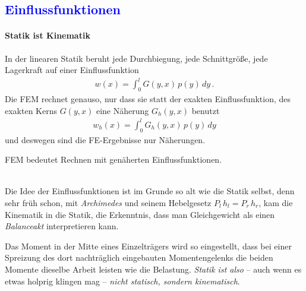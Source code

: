 {\textcolor{blue}{\chapter{Einflussfunktionen}}}

{\textcolor{sectionTitleBlue}{\subsubsection*{Statik ist Kinematik}}}

In der linearen Statik beruht jede Durchbiegung, jede Schnittgr\"{o}{\ss}e, jede Lagerkraft auf einer Einflussfunktion
\begin{align}
w(x) = \int_{0}^{l} G(y,x)\,p(y)\,dy\,.
\end{align}
Die FEM rechnet genauso, nur dass sie statt der exakten Einflussfunktion, des exakten Kerns $G(y,x)$ eine N\"{a}herung $G_h(y,x)$ benutzt
\begin{align}
w_h(x) = \int_{0}^{l} G_h(y,x)\,p(y)\,dy
\end{align}
und deswegen sind die FE-Ergebnisse nur N\"{a}herungen.\\

\hspace*{-12pt}\colorbox{highlightBlue}{\parbox{0.98\textwidth}{ FEM bedeutet Rechnen mit gen\"{a}herten Einflussfunktionen. }}\\

Die Idee der Einflussfunktionen ist im Grunde so alt wie die Statik selbst, denn sehr fr\"{u}h schon, mit {\em Archimedes\/} und seinem Hebelgesetz $ P_l \, h_l = P_r \, h_r$, kam die Kinematik in die Statik, die Erkenntnis, dass man Gleichgewicht als einen {\em Balanceakt\/} interpretieren kann.


Das Moment in der Mitte eines Einzeltr\"{a}gers wird so eingestellt, dass bei einer Spreizung des dort nachtr\"{a}glich eingebauten Momentengelenks die beiden Momente dieselbe Arbeit leisten wie die Belastung. {\em Statik ist also} -- auch wenn es etwas holprig klingen mag -- {\em nicht statisch, sondern kinematisch\/}.


